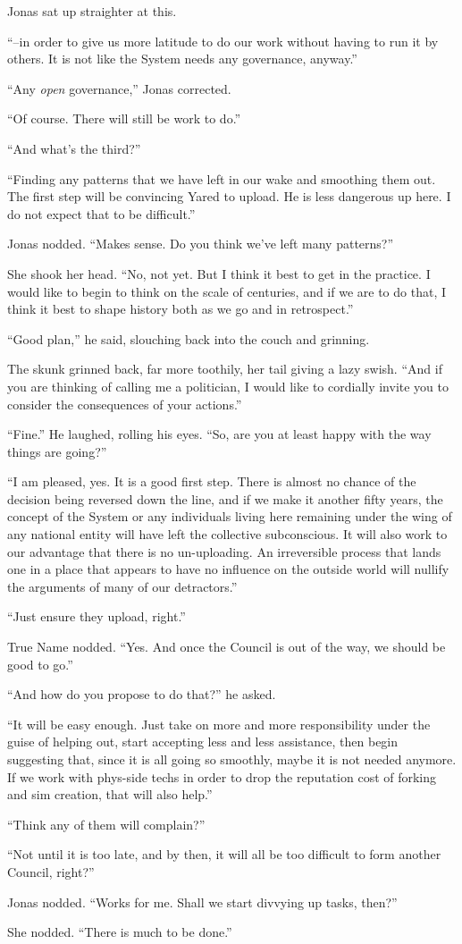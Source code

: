 Jonas sat up straighter at this.

``--in order to give us more latitude to do our work without having to run it by others. It is not like the System needs any governance, anyway.''

``Any \emph{open} governance,'' Jonas corrected.

``Of course. There will still be work to do.''

``And what's the third?''

``Finding any patterns that we have left in our wake and smoothing them out. The first step will be convincing Yared to upload. He is less dangerous up here. I do not expect that to be difficult.''

Jonas nodded. ``Makes sense. Do you think we've left many patterns?''

She shook her head. ``No, not yet. But I think it best to get in the practice. I would like to begin to think on the scale of centuries, and if we are to do that, I think it best to shape history both as we go and in retrospect.''

``Good plan,'' he said, slouching back into the couch and grinning.

The skunk grinned back, far more toothily, her tail giving a lazy swish. ``And if you are thinking of calling me a politician, I would like to cordially invite you to consider the consequences of your actions.''

``Fine.'' He laughed, rolling his eyes. ``So, are you at least happy with the way things are going?''

``I am pleased, yes. It is a good first step. There is almost no chance of the decision being reversed down the line, and if we make it another fifty years, the concept of the System or any individuals living here remaining under the wing of any national entity will have left the collective subconscious. It will also work to our advantage that there is no un-uploading. An irreversible process that lands one in a place that appears to have no influence on the outside world will nullify the arguments of many of our detractors.''

``Just ensure they upload, right.''

True Name nodded. ``Yes. And once the Council is out of the way, we should be good to go.''

``And how do you propose to do that?'' he asked.

``It will be easy enough. Just take on more and more responsibility under the guise of helping out, start accepting less and less assistance, then begin suggesting that, since it is all going so smoothly, maybe it is not needed anymore. If we work with phys-side techs in order to drop the reputation cost of forking and sim creation, that will also help.''

``Think any of them will complain?''

``Not until it is too late, and by then, it will all be too difficult to form another Council, right?''

Jonas nodded. ``Works for me. Shall we start divvying up tasks, then?''

She nodded. ``There is much to be done.''
